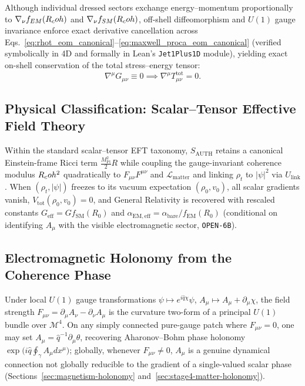 Although individual dressed sectors exchange energy--momentum proportionally to $\nabla_\nu f_{EM}(R_coh)$ and $\nabla_\nu f_{SM}(R_coh)$, off-shell diffeomorphism and $U(1)$ gauge invariance enforce exact derivative cancellation across Eqs.~\eqref{eq:rhot_eom_canonical}--\eqref{eq:maxwell_proca_eom_canonical} (verified symbolically in 4D and formally in Lean's \texttt{Jet1Plus1D} module), yielding exact on-shell conservation of the total stress--energy tensor:
\begin{equation}
\nabla^\mu G_{\mu\nu} \equiv 0
\implies
\nabla^\mu T_{\mu\nu}^{\mathrm{tot}} = 0.
\label{eq:bianchi_noether_total}
\end{equation}

\subsection{Physical Classification: Scalar--Tensor Effective Field Theory}

Within the standard scalar--tensor EFT taxonomy, $S_{\mathrm{AUTH}}$ retains a canonical Einstein-frame Ricci term $\frac{M_{\mathrm{Pl}}^2}{2}R$ while coupling the gauge-invariant coherence modulus $R_coh^2$ quadratically to $F_{\mu\nu}F^{\mu\nu}$ and $\mathcal{L}_{\mathrm{matter}}$ and linking $\rho_t$ to $|\psi|^2$ via $U_{\mathrm{link}}$. When $(\rho_t, |\psi|)$ freezes to its vacuum expectation $(\rho_0, v_0)$, all scalar gradients vanish, $V_{\mathrm{tot}}(\rho_0, v_0) = 0$, and General Relativity is recovered with rescaled constants $G_{\mathrm{eff}} = G f_{\mathrm{SM}}(R_0)$ and $\alpha_{\mathrm{EM,eff}} = \alpha_{\mathrm{bare}}/f_{\mathrm{EM}}(R_0)$ (conditional on identifying $A_\mu$ with the visible electromagnetic sector, \texttt{OPEN-6B}).

\subsection{Electromagnetic Holonomy from the Coherence Phase}

Under local $U(1)$ gauge transformations $\psi \mapsto e^{i\hat{q}\chi}\psi$, $A_\mu \mapsto A_\mu + \partial_\mu\chi$, the field strength $F_{\mu\nu} = \partial_\mu A_\nu - \partial_\nu A_\mu$ is the curvature two-form of a principal $U(1)$ bundle over $\mathcal{M}^4$. On any simply connected pure-gauge patch where $F_{\mu\nu} = 0$, one may set $A_\mu = \hat{q}^{-1}\partial_\mu\theta$, recovering Aharonov--Bohm phase holonomy $\exp\bigl(i\hat{q}\oint_\gamma A_\mu dx^\mu\bigr)$; globally, whenever $F_{\mu\nu} \ne 0$, $A_\mu$ is a genuine dynamical connection not globally reducible to the gradient of a single-valued scalar phase (Sections~\ref{sec:magnetism-holonomy} and~\ref{sec:stage4-matter-holonomy}).

